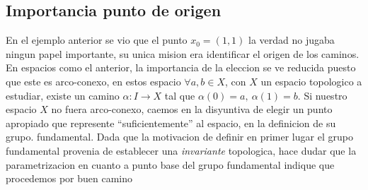 \subsection{Importancia punto de origen}
En el ejemplo anterior se vio que el punto \(x_0 = (1,1)\) la verdad no
jugaba ningun papel importante, su unica mision era identificar el
origen de los caminos. En espacios como el anterior, la importancia de
la eleccion se ve reducida puesto que este es arco-conexo, en estos
espacio \(\forall a,b \in X\), con \(X\) un espacio topologico a
estudiar, existe un camino \(\alpha : I \to X\) tal que \(\alpha (0) =
a,\ \alpha (1) = b\). Si nuestro espacio \(X\) no fuera arco-conexo,
caemos en la disyuntiva de elegir un punto apropiado que represente
``suficientemente'' al espacio, en la definicion de su grupo.
fundamental. Dada que la motivacion de definir en primer lugar el grupo
fundamental provenia de establecer una \emph{invariante} topologica,
hace dudar que la parametrizacion en cuanto a punto base del grupo
fundamental indique que procedemos por buen camino

